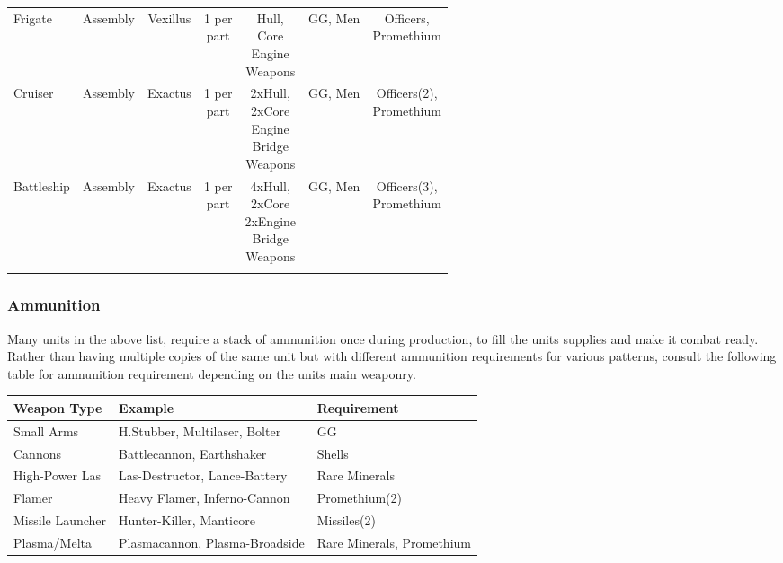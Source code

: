 \begin{center}
\begin{longtable}{l l c c c c c}
    Frigate & Assembly & Vexillus & \makecell{1 per\\part}& \makecell{Hull,\\Core\\Engine\\Weapons} & GG, Men & \makecell{Officers,\\Promethium} \\\addlinespace
    Cruiser & Assembly & Exactus & \makecell{1 per\\part}& \makecell{2xHull,\\2xCore\\Engine\\Bridge\\Weapons} & GG, Men & \makecell{Officers(2),\\Promethium} \\\addlinespace
    Battleship & Assembly & Exactus & \makecell{1 per\\part}& \makecell{4xHull,\\2xCore\\2xEngine\\Bridge\\Weapons} & GG, Men & \makecell{Officers(3),\\Promethium} \\\addlinespace
     
        \bottomrule
\end{longtable}
\end{center}
\subsubsection{Ammunition}\label{ammo}
Many units in the above list, require a stack of ammunition once during production, to fill the units supplies and make it combat ready. Rather than having multiple copies of the same unit but with different ammunition requirements for various patterns, consult the following table for ammunition requirement depending on the units main weaponry.
\begin{longtable}{l l l}\toprule
     Weapon Type & Example & Requirement  \\\midrule\endhead
     Small Arms & H.Stubber, Multilaser, Bolter & GG\\ \addlinespace
     Cannons & Battlecannon, Earthshaker & Shells \\\addlinespace
     High-Power Las & Las-Destructor, Lance-Battery & Rare Minerals \\\addlinespace
     Flamer & Heavy Flamer, Inferno-Cannon & Promethium(2) \\\addlinespace
     Missile Launcher & Hunter-Killer, Manticore & Missiles(2)\\\addlinespace
     Plasma/Melta & Plasmacannon, Plasma-Broadside & Rare Minerals, Promethium \\\bottomrule
\end{longtable}
